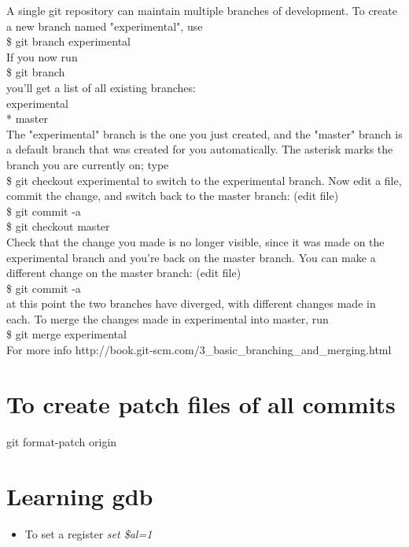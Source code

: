 \documentclass[a4paper,10pt]{article}
\begin{document}
A single git repository can maintain multiple branches of development. To create a new branch named "experimental", use\\
\$ git branch experimental\\
If you now run\\
\$ git branch\\
you'll get a list of all existing branches:\\
experimental\\
* master\\
	The "experimental" branch is the one you just created, and the "master" branch is a default branch that was created for you automatically. The asterisk marks the branch you are currently on; type\\
\$ git checkout experimental
	to switch to the experimental branch. Now edit a file, commit the change, and switch back to the master branch:
	(edit file)\\
\$ git commit -a\\
\$ git checkout master\\
Check that the change you made is no longer visible, since it was made on the experimental branch and you're back on the master branch.
	You can make a different change on the master branch:
	(edit file)\\
\$ git commit -a\\
at this point the two branches have diverged, with different changes made in each. To merge the changes made in experimental into master, run\\
\$ git merge experimental\\

For more info http://book.git-scm.com/3\_basic\_branching\_and\_merging.html\\

\section{To create patch files of all commits}
git format-patch origin
\section{Learning gdb}

\begin{itemize}
\item To set a register \emph{set \$al=1}
\end{itemize}
\end{document}
